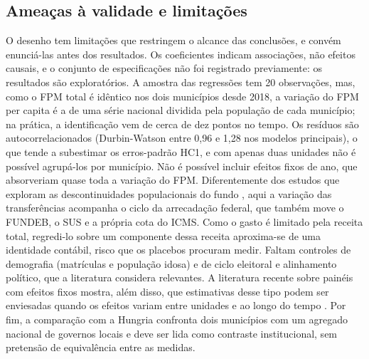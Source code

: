 \subsection{Ameaças à validade e limitações}

O desenho tem limitações que restringem o alcance das conclusões, e convém enunciá-las antes dos resultados. Os coeficientes indicam associações, não efeitos causais, e o conjunto de especificações não foi registrado previamente: os resultados são exploratórios. A amostra das regressões tem 20 observações, mas, como o FPM total é idêntico nos dois municípios desde 2018, a variação do FPM per capita é a de uma série nacional dividida pela população de cada município; na prática, a identificação vem de cerca de dez pontos no tempo. Os resíduos são autocorrelacionados (Durbin-Watson entre 0,96 e 1,28 nos modelos principais), o que tende a subestimar os erros-padrão HC1, e com apenas duas unidades não é possível agrupá-los por município. Não é possível incluir efeitos fixos de ano, que absorveriam quase toda a variação do FPM. Diferentemente dos estudos que exploram as descontinuidades populacionais do fundo \citep{Bernardelli2026, Castro2021221}, aqui a variação das transferências acompanha o ciclo da arrecadação federal, que também move o FUNDEB, o SUS e a própria cota do ICMS. Como o gasto é limitado pela receita total, regredi-lo sobre um componente dessa receita aproxima-se de uma identidade contábil, risco que os placebos procuram medir. Faltam controles de demografia (matrículas e população idosa) e de ciclo eleitoral e alinhamento político, que a literatura considera relevantes. A literatura recente sobre painéis com efeitos fixos mostra, além disso, que estimativas desse tipo podem ser enviesadas quando os efeitos variam entre unidades e ao longo do tempo \citep{Baker2022}. Por fim, a comparação com a Hungria confronta dois municípios com um agregado nacional de governos locais e deve ser lida como contraste institucional, sem pretensão de equivalência entre as medidas.
